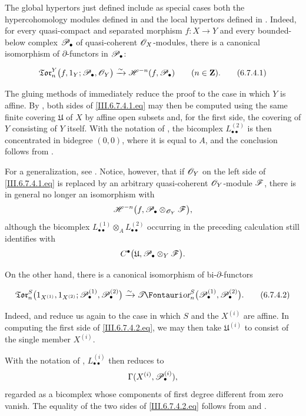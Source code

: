\begin{remark}[6.7.4]
\label{III.6.7.4}
The global hypertors just defined include as special cases both
the hypercohomology modules defined in  and the
local hypertors defined in .  Indeed, for every
quasi-compact and separated morphism $f:X\to Y$ and every
bounded-below complex $\mathscr{P}_\bullet$ of quasi-coherent
$\mathscr{O}_X$-modules, there is a canonical isomorphism of
$\partial$-functors in $\mathscr{P}_\bullet$:
\begin{env}[6.7.4.1]
\label{III.6.7.4.1}
\[
  \mathfrak{Tor}_n^Y
  \bigl(
    f,1_Y;
    \sh P_\bullet,\sh O_Y
  \bigr)
  \xrightarrow{\sim}
  \sh H^{-n}(f,\sh P_\bullet)
  \qquad(n\in\mathbf Z).
  \tag{6.7.4.1}\label{III.6.7.4.1.eq}
\]
\end{env}
The gluing methods of  immediately reduce the
proof to the case in which $Y$ is affine.  By
, both sides of
\eqref{III.6.7.4.1.eq} may then be computed using the same
finite covering $\mathfrak U$ of $X$ by affine open subsets and,
for the first side, the covering of $Y$ consisting of $Y$
itself.  With the notation of , the bicomplex
$L_{\bullet\bullet}^{(2)}$ is then concentrated in bidegree
$(0,0)$, where it is equal to $A$, and the conclusion follows
from .

For a generalization, see .  Notice, however,
that if $\mathscr{O}_Y$ on the left side of
\eqref{III.6.7.4.1.eq} is replaced by an arbitrary
quasi-coherent $\mathscr{O}_Y$-module $\mathscr{F}$, there is in general no
longer an isomorphism with
\[
  \mathscr{H}^{-n}
  \bigl(
    f,\mathscr{P}_\bullet\otimes_{\mathscr{O}_Y}\mathscr{F}
  \bigr),
\]
although the bicomplex
$L_{\bullet\bullet}^{(1)}\otimes_A
 L_{\bullet\bullet}^{(2)}$ occurring in the preceding
calculation still identifies with
\[
  C^\bullet
  \bigl(
    \mathfrak U,
    \mathscr{P}_\bullet\otimes_Y\mathscr{F}
  \bigr).
\]

On the other hand, there is a canonical isomorphism of
bi-$\partial$-functors
\begin{env}[6.7.4.2]
\label{III.6.7.4.2}
\[
  \mathfrak{Tor}_n^S
  \bigl(
    1_{X^{(1)}},1_{X^{(2)}};
    \sh P_\bullet^{(1)},\sh P_\bullet^{(2)}
  \bigr)
  \xrightarrow{\sim}
  \shTor_n^S
  \bigl(
    \sh P_\bullet^{(1)},\sh P_\bullet^{(2)}
  \bigr).
  \tag{6.7.4.2}\label{III.6.7.4.2.eq}
\]
\end{env}
Indeed,  and  reduce us again to
the case in which $S$ and the $X^{(i)}$ are affine.  In
computing the first side of \eqref{III.6.7.4.2.eq}, we may then
take $\mathfrak U^{(i)}$ to consist of the single member
$X^{(i)}$.


With the notation of ,
$L_{\bullet\bullet}^{(i)}$ then reduces to
\[
  \Gamma(X^{(i)},\mathscr{P}_\bullet^{(i)}),
\]
regarded as a bicomplex whose components of first degree
different from zero vanish.  The equality of the two sides of
\eqref{III.6.7.4.2.eq} follows from  and
.
\end{remark}

